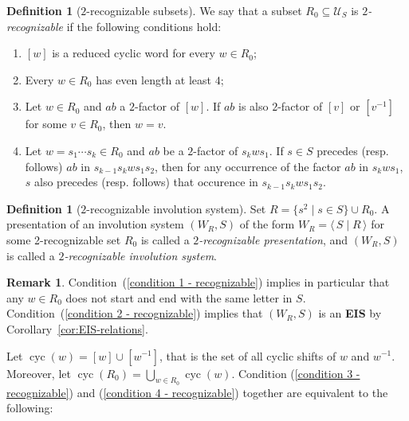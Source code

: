 \documentclass[A4paper, oneside]{amsart}
\newcommand{\mpair}[1]{\langle\, #1\,\rangle}  %
\newcommand{\cyc}{\operatorname{cyc}}
\newcommand{\U}{\mathcal{U}}
\newcommand{\EIS}{\textnormal{\bf EIS}\xspace}
\theoremstyle{definition}
\newtheorem{rem}[thm]{Remark}
\newtheorem{defi}[thm]{Definition}
\begin{document}
\begin{defi}[$2$-recognizable subsets] \label{def: 2-rec subsets}
    We say that a subset $R_0 \subseteq \U_S$ is \emph{$2$-recognizable} if the following conditions hold:
\begin{enumerate}[series=2-recognizable]    
    \item \label{condition 1 - recognizable} $[w]$ is a reduced cyclic word for every $w \in R_0$;

    \item \label{condition 2 - recognizable} Every $w \in R_0$ has even length at least $4$;

	\item
	\label{condition 3 - recognizable}
	Let $w\in R_0$ and $ab$ a $2$-factor of $[w]$. If $ab$ is also $2$-factor of $[v]$ or $[v^{-1}]$ for some $v\in R_0$, then $w=v$.
   
    \item \label{condition 4 - recognizable} Let $w=s_1\cdots s_k\in R_0$ and $ab$ be a $2$-factor of $s_kws_1$. If $s\in S$ precedes (resp. follows) $ab$ in $s_{k-1} s_kws_1 s_2$, then for any occurrence of the factor $ab$ in $s_kws_1$,  $s$  also precedes (resp. follows) that occurence in $s_{k-1} s_kws_1 s_2$.
\end{enumerate}
\end{defi}

\begin{defi}[$2$-recognizable involution system]
Set $R= \{s^2 \mid s \in S\} \cup R_0$.  A presentation of an involution system $(W_R,S)$ of the form $ W_R=\mpair{S\mid R}$ for some 2-recognizable set $R_0$ is called a {\em $2$-recognizable presentation}, and $(W_R,S)$ is called a {\em $2$-recognizable involution system}. 
\end{defi}

\begin{rem}\label{rem:Recognizable}
	Condition~(\ref{condition 1 - recognizable}) implies in particular that any $w\in R_0$ does not start and end with the same letter in $S$. Condition~(\ref{condition 2 - recognizable}) implies that $(W_R,S)$ is an \EIS by Corollary~\ref{cor:EIS-relations}.
\end{rem}

Let $\cyc(w) = [w] \cup [w^{-1}]$, that is the set of all cyclic shifts of $w$ and $w^{-1}$. Moreover, let $\cyc(R_0) = \bigcup_{w \in R_0} \cyc(w)$. Condition (\ref{condition 3 - recognizable}) and (\ref{condition 4 - recognizable}) together are equivalent to the following:
\end{document}
